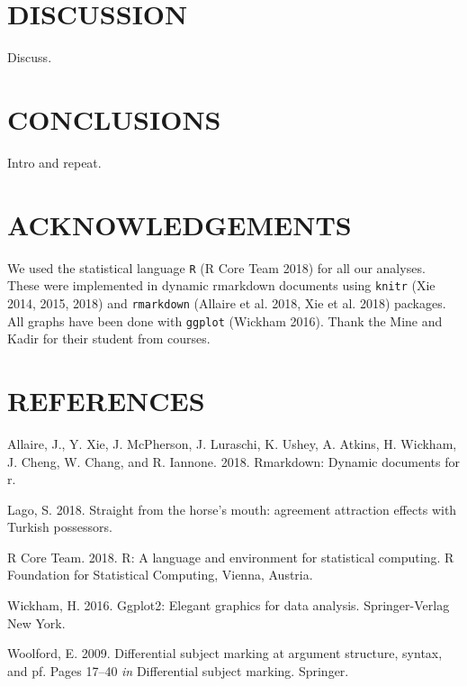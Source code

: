 \documentclass[11pt,a4paper]{article}
\begin{document}
\hypertarget{discussion}{%
\section{DISCUSSION}\label{discussion}}

Discuss.

\hypertarget{conclusions}{%
\section{CONCLUSIONS}\label{conclusions}}

Intro and repeat.

\hypertarget{acknowledgements}{%
\section{ACKNOWLEDGEMENTS}\label{acknowledgements}}

We used the statistical language \texttt{R} (R Core Team 2018) for all
our analyses. These were implemented in dynamic rmarkdown documents
using \texttt{knitr} (Xie 2014, 2015, 2018) and \texttt{rmarkdown}
(Allaire et al. 2018, Xie et al. 2018) packages. All graphs have been
done with \texttt{ggplot} (Wickham 2016). Thank the Mine and Kadir for
their student from courses.

\hypertarget{references}{%
\section{REFERENCES}\label{references}}

\hypertarget{refs}{}
\leavevmode\hypertarget{ref-Allaire_2018}{}%
Allaire, J., Y. Xie, J. McPherson, J. Luraschi, K. Ushey, A. Atkins, H.
Wickham, J. Cheng, W. Chang, and R. Iannone. 2018. Rmarkdown: Dynamic
documents for r.

\leavevmode\hypertarget{ref-Lago}{}%
Lago, S. 2018. Straight from the horse's mouth: agreement attraction
effects with Turkish possessors.

\leavevmode\hypertarget{ref-R_Core_Team_2018}{}%
R Core Team. 2018. R: A language and environment for statistical
computing. R Foundation for Statistical Computing, Vienna, Austria.

\leavevmode\hypertarget{ref-Wickham_2016}{}%
Wickham, H. 2016. Ggplot2: Elegant graphics for data analysis.
Springer-Verlag New York.

\leavevmode\hypertarget{ref-woolford}{}%
Woolford, E. 2009. Differential subject marking at argument structure,
syntax, and pf. Pages 17--40 \emph{in} Differential subject marking.
Springer.
\end{document}
